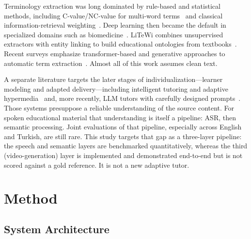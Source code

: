 \documentclass[conference]{IEEEtran}
\begin{document}
Terminology extraction was long dominated by rule-based and statistical methods, including C-value/NC-value for multi-word terms~\cite{frantzi2000} and classical information-retrieval weighting~\cite{manning2008}. Deep learning then became the default in specialized domains such as biomedicine~\cite{lossio2016}. LiTeWi combines unsupervised extractors with entity linking to build educational ontologies from textbooks~\cite{conde2016}. Recent surveys emphasize transformer-based and generative approaches to automatic term extraction~\cite{tran2026}. Almost all of this work assumes clean text.

A separate literature targets the later stages of individualization---learner modeling and adapted delivery---including intelligent tutoring and adaptive hypermedia~\cite{brusilovsky2007,corbett1995,vanlehn2011} and, more recently, LLM tutors with carefully designed prompts~\cite{xu2024,vanzo2025}. Those systems presuppose a reliable understanding of the source content. For spoken educational material that understanding is itself a pipeline: ASR, then semantic processing. Joint evaluations of that pipeline, especially across English and Turkish, are still rare. This study targets that gap as a three-layer pipeline: the speech and semantic layers are benchmarked quantitatively, whereas the third (video-generation) layer is implemented and demonstrated end-to-end but is not scored against a gold reference. It is not a new adaptive tutor.

\section{Method}

\subsection{System Architecture}
\end{document}
